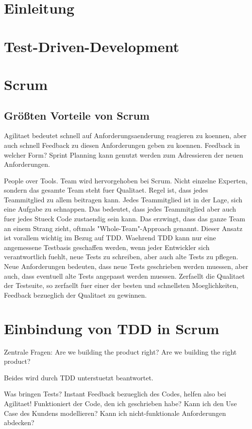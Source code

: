 \documentclass[12pt,DIV14,BCOR10mm,a4paper,twoside,parskip=half-,headsepline,headinclude,english,ngerman,bibliography=totocnumbered]{scrreprt}
\begin{document}
\chapter{Einleitung}
\chapter{Test-Driven-Development}
\chapter{Scrum}

\section{Größten Vorteile von Scrum}

Agilitaet bedeutet schnell auf Anforderungsaenderung reagieren zu koennen, aber auch schnell Feedback zu diesen Anforderungen geben zu koennen.
Feedback in welcher Form?
Sprint Planning kann genutzt werden zum Adressieren der neuen Anforderungen.

People over Tools.
Team wird hervorgehoben bei Scrum.
Nicht einzelne Experten, sondern das gesamte Team steht fuer Qualitaet.
Regel ist, dass jedes Teammitglied zu allem beitragen kann.
Jedes Teammitglied ist in der Lage, sich eine Aufgabe zu schnappen.
Das bedeutet, dass jedes Teammitglied aber auch fuer jedes Stueck Code zustaendig sein kann.
Das erzwingt, dass das ganze Team an einem Strang zieht, oftmals "Whole-Team"-Approach genannt.
Dieser Ansatz ist vorallem wichtig im Bezug auf TDD.
Waehrend TDD kann nur eine angemessene Testbasis geschaffen werden, wenn jeder Entwickler sich verantwortlich fuehlt, neue Tests zu schreiben, aber auch alte Tests zu pflegen.
Neue Anforderungen bedeuten, dass neue Tests geschrieben werden muessen, aber auch, dass eventuell alte Tests angepasst werden muessen.
Zerfaellt die Qualitaet der Testsuite, so zerfaellt fuer einer der besten und schnellsten Moeglichkeiten, Feedback bezueglich der Qualitaet zu gewinnen.

\chapter{Einbindung von TDD in Scrum}

Zentrale Fragen:
Are we building the product right?
Are we building the right product?

Beides wird durch TDD unterstuetzt beantwortet.

Was bringen Tests?
Instant Feedback bezueglich des Codes, helfen also bei Agilitaet!
Funktioniert der Code, den ich geschrieben habe?
Kann ich den Use Case des Kundens modellieren?
Kann ich nicht-funktionale Anforderungen abdecken?
\end{document}
